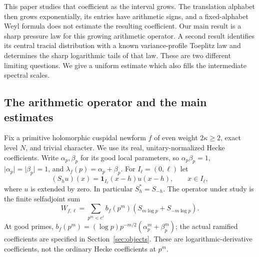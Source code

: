 \documentclass[11pt,reqno]{amsart}
\numberwithin{equation}{section}
\newcommand{\one}{\mathbf 1}
\newcommand{\abs}[1]{\lvert#1\rvert}
\begin{document}
This paper studies that coefficient as the interval grows. The
translation alphabet then grows exponentially, its entries have
arithmetic signs, and a fixed-alphabet Weyl formula does not estimate
the resulting coefficient. Our main result is a sharp pressure law
for this growing arithmetic operator. A second result identifies its
central tracial distribution with a known variance-profile Toeplitz
law and determines the sharp logarithmic tails of that law. These
are two different limiting questions. We give a uniform estimate
which also fills the intermediate spectral scales.

\subsection*{The arithmetic operator and the main estimates}

Fix a primitive holomorphic cuspidal newform $f$ of even weight
$2\kappa\ge2$, exact level $N$, and trivial character. We use its
real, unitary-normalized Hecke coefficients. Write $\alpha_p,\beta_p$
for its good local parameters, so
$\alpha_p\beta_p=1$, $\abs{\alpha_p}=\abs{\beta_p}=1$, and
$\lambda_f(p)=\alpha_p+\beta_p$.
For $I_\ell=(0,\ell)$ let
\[
 (S_hu)(x)=\one_{I_\ell}(x-h)u(x-h),\qquad x\in I_\ell,
\]
where $u$ is extended by zero. In particular $S_h^*=S_{-h}$.
The operator under study is the finite selfadjoint sum
\begin{equation}\label{eq:W-intro}
 W_{f,\ell}=\sum_{p^m<e^\ell}b_f(p^m)
             (S_{m\log p}+S_{-m\log p}).
\end{equation}
At good primes,
$b_f(p^m)=(\log p)p^{-m/2}(\alpha_p^m+\beta_p^m)$;
the actual ramified coefficients are specified in
Section~\ref{sec:objects}. These are logarithmic-derivative
coefficients, not the ordinary Hecke coefficients at $p^m$.
\end{document}
